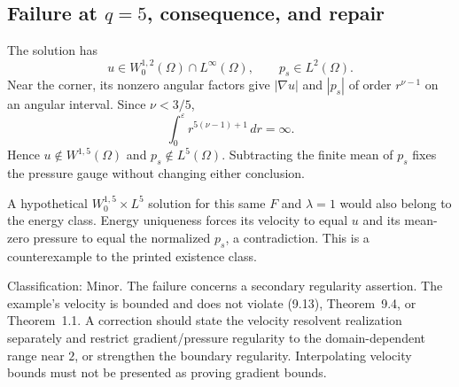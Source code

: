 \documentclass[10pt]{article}
\begin{document}
\subsection*{Failure at \(q=5\), consequence, and repair}
The solution has \[u\in W^{1,2}_0(\Omega)\cap L^\infty(\Omega),
 \qquad p_s\in L^2(\Omega).\] Near the corner, its nonzero angular factors give \(|\nabla u|\) and \(|p_s|\) of order \(r^{\nu-1}\) on an angular interval. Since \(\nu<3/5\), \[\int_0^\varepsilon r^{5(\nu-1)+1}\,dr=\infty.\] Hence \(u\notin W^{1,5}(\Omega)\) and \(p_s\notin L^5(\Omega)\). Subtracting the finite mean of \(p_s\) fixes the pressure gauge without changing either conclusion.\par
A hypothetical \(W^{1,5}_0\times L^5\) solution for this same \(F\) and \(\lambda=1\) would also belong to the energy class. Energy uniqueness forces its velocity to equal \(u\) and its mean-zero pressure to equal the normalized \(p_s\), a contradiction. This is a counterexample to the printed existence class.\par
Classification: Minor. The failure concerns a secondary regularity assertion. The example’s velocity is bounded and does not violate (9.13), Theorem 9.4, or Theorem 1.1. A correction should state the velocity resolvent realization separately and restrict gradient/pressure regularity to the domain-dependent range near \(2\), or strengthen the boundary regularity. Interpolating velocity bounds must not be presented as proving gradient bounds.\par
\end{document}
